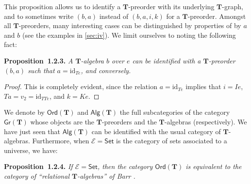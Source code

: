 \documentclass{article}
\newenvironment{itenv}[1]
  {\phantomsection\par\medskip\noindent\textbf{#1.}\itshape}
  {\par\medskip}
\newcommand{\oldpage}[1]{\marginpar{\footnotesize$\Big\vert$ \textit{p.~#1}}}
\newcommand{\id}{\mathrm{id}}
\newcommand{\TT}{\mathbf{T}}
\newcommand{\cat}[1]{\mathcal{#1}}
\newcommand{\Cat}[1]{\mathsf{#1}}
\newcommand{\Gr}[1]{\Cat{Gr}(#1)}
\newcommand{\Alg}[1]{\Cat{Alg}(#1)}
\newcommand{\Ord}[1]{\Cat{Ord}(#1)}
\begin{document}
This proposition allows us to identify a $\TT$-preorder with its underlying $\TT$-graph, and to sometimes write $(b,a)$ instead of $(b,a,i,k)$ for a $\TT$-preorder.
Amongst all $\TT$-preorders, many interesting cases can be distinguished by properties of by $a$ and $b$ (see the examples in \cref{sec:iv}).
We limit ourselves to noting the following fact:

\begin{itenv}{Proposition~1.2.3}
  A $\TT$-algebra $b$ over $e$ can be identified with a $\TT$-preorder $(b,a)$ such that $a=\id_{Te}$, and conversely.
\end{itenv}

\begin{proof}
  This is completely evident, since the relation $a=\id_{Te}$ implies that $i=Ie$, $Ta=v_2=\id_{TTe}$, and $k=Ke$.
\end{proof}

\oldpage{231}
We denote by $\Ord{\TT}$ and $\Alg{\TT}$ the full subcategories of the category $\Gr{\TT}$ whose objects are the $\TT$-preorders and the $\TT$-algebras (respectively).
We have just seen that $\Alg{\TT}$ can be identified with the usual category of $\TT$-algebras.
Furthermore, when $\cat{E}=\Cat{Set}$ is the category of sets associated to a universe, we have:

\begin{itenv}{Proposition~1.2.4}
\label{proposition:i.2.4}
  If $\cat{E}=\Cat{Set}$, then the category $\Ord{\TT}$ is equivalent to the category of ``relational $\TT$-algebras'' of Barr {\cite{Ba}}.
\end{itenv}
\end{document}
